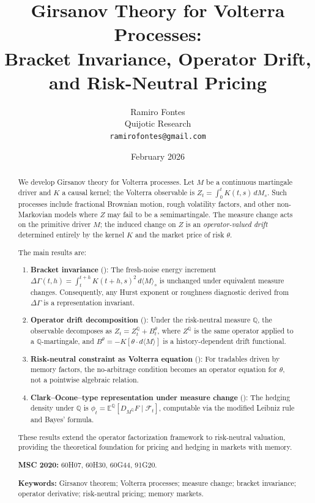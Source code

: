 \documentclass[11pt]{article}
\title{Girsanov Theory for Volterra Processes:\\[0.3em]
Bracket Invariance, Operator Drift, and Risk-Neutral Pricing}
\author{Ramiro Fontes\\[0.5em]
\small Quijotic Research\\[0.3em]
\small\texttt{ramirofontes@gmail.com}}
\date{February 2026}
\theoremstyle{plain}
\theoremstyle{definition}
\theoremstyle{remark}
\newcommand{\E}{\mathbb{E}}
\newcommand{\F}{\mathcal{F}}
\newcommand{\QQ}{\mathbb{Q}}
\newcommand{\dGamma}{\Delta\Gamma}
\newcommand{\bracket}[1]{\langle #1 \rangle}
\begin{document}
\maketitle

\begin{abstract}
We develop Girsanov theory for Volterra processes. Let $M$ be a continuous
martingale driver and $K$ a causal kernel; the Volterra observable is
$Z_t = \int_0^t K(t,s)\,dM_s$. Such processes include fractional Brownian
motion, rough volatility factors, and other non-Markovian models where $Z$
may fail to be a semimartingale. The measure change acts on the primitive
driver $M$; the induced change on $Z$ is an \emph{operator-valued drift}
determined entirely by the kernel $K$ and the market price of risk $\theta$.

The main results are:
\begin{enumerate}[label=(\roman*)]
\item \textbf{Bracket invariance} (): The fresh-noise
energy increment $\dGamma(t,h) = \int_t^{t+h} K(t+h,s)^2\,d\bracket{M}_s$ is
unchanged under equivalent measure changes. Consequently, any Hurst exponent
or roughness diagnostic derived from $\dGamma$ is a representation invariant.

\item \textbf{Operator drift decomposition} (): Under
the risk-neutral measure $\QQ$, the observable decomposes as
$Z_t = Z_t^{\QQ} + B_t^\theta$, where $Z^{\QQ}$ is the same operator applied
to a $\QQ$-martingale, and $B^\theta = -K[\theta \cdot d\bracket{M}]$ is a
history-dependent drift functional.

\item \textbf{Risk-neutral constraint as Volterra equation} ():
For tradables driven by memory factors, the no-arbitrage condition becomes
an operator equation for $\theta$, not a pointwise algebraic relation.

\item \textbf{Clark--Ocone--type representation under measure change} ():
The hedging density under $\QQ$ is $\phi_t = \E^{\QQ}[D_{M^{\QQ}} F \mid \F_t]$,
computable via the modified Leibniz rule and Bayes' formula.
\end{enumerate}

These results extend the operator factorization framework to risk-neutral
valuation, providing the theoretical foundation for pricing and hedging in
markets with memory.

\medskip
\noindent\textbf{MSC 2020:} 60H07, 60H30, 60G44, 91G20.

\noindent\textbf{Keywords:} Girsanov theorem; Volterra processes; measure change;
bracket invariance; operator derivative; risk-neutral pricing; memory markets.
\end{abstract}
\end{document}
